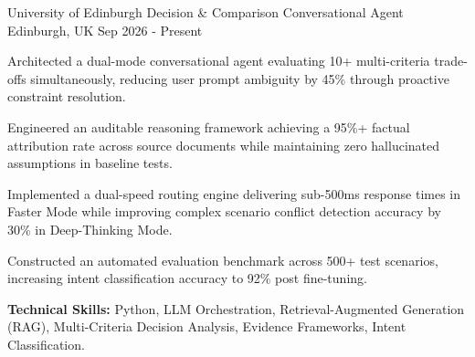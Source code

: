 

\begin{cventries}

\cventry
    {University of Edinburgh} %
    {Decision \& Comparison Conversational Agent} %
    {Edinburgh, UK} %
    {Sep 2026 - Present} %
    {
      \begin{cvitems} %
        \item {Architected a dual-mode conversational agent evaluating 10+ multi-criteria trade-offs simultaneously, reducing user prompt ambiguity by 45\% through proactive constraint resolution.}
        \item {Engineered an auditable reasoning framework achieving a 95\%+ factual attribution rate across source documents while maintaining zero hallucinated assumptions in baseline tests.}
        \item {Implemented a dual-speed routing engine delivering sub-500ms response times in Faster Mode while improving complex scenario conflict detection accuracy by 30\% in Deep-Thinking Mode.}
        \item {Constructed an automated evaluation benchmark across 500+ test scenarios, increasing intent classification accuracy to 92\% post fine-tuning.}
        \item {\textbf{Technical Skills:} Python, LLM Orchestration, Retrieval-Augmented Generation (RAG), Multi-Criteria Decision Analysis, Evidence Frameworks, Intent Classification.}
      \end{cvitems}
    }


\end{cventries}
